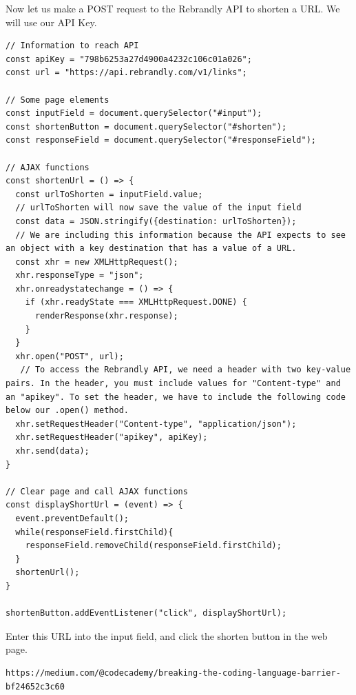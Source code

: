 \documentclass[11pt]{article}
\begin{document}
Now let us make a POST request to the Rebrandly API to shorten a URL. We will use our API Key. 
\begin{lstlisting}
// Information to reach API
const apiKey = "798b6253a27d4900a4232c106c01a026";
const url = "https://api.rebrandly.com/v1/links";

// Some page elements
const inputField = document.querySelector("#input");
const shortenButton = document.querySelector("#shorten");
const responseField = document.querySelector("#responseField");

// AJAX functions
const shortenUrl = () => {
  const urlToShorten = inputField.value; 
  // urlToShorten will now save the value of the input field
  const data = JSON.stringify({destination: urlToShorten});
  // We are including this information because the API expects to see an object with a key destination that has a value of a URL.
  const xhr = new XMLHttpRequest(); 
  xhr.responseType = "json"; 
  xhr.onreadystatechange = () => {
    if (xhr.readyState === XMLHttpRequest.DONE) {
      renderResponse(xhr.response);
    }
  }
  xhr.open("POST", url); 
   // To access the Rebrandly API, we need a header with two key-value pairs. In the header, you must include values for "Content-type" and an "apikey". To set the header, we have to include the following code below our .open() method.
  xhr.setRequestHeader("Content-type", "application/json");
  xhr.setRequestHeader("apikey", apiKey);
  xhr.send(data); 
}

// Clear page and call AJAX functions
const displayShortUrl = (event) => {
  event.preventDefault();
  while(responseField.firstChild){
    responseField.removeChild(responseField.firstChild);
  }
  shortenUrl();
}

shortenButton.addEventListener("click", displayShortUrl);
\end{lstlisting}
\newpage
Enter this URL into the input field, and click the shorten button in the web page.
\begin{lstlisting}[basicstyle=\small\ttfamily\color{theWhite}, backgroundcolor = \color{theBlack}, language = Comment]
https://medium.com/@codecademy/breaking-the-coding-language-barrier-bf24652c3c60
\end{lstlisting}
\end{document}
